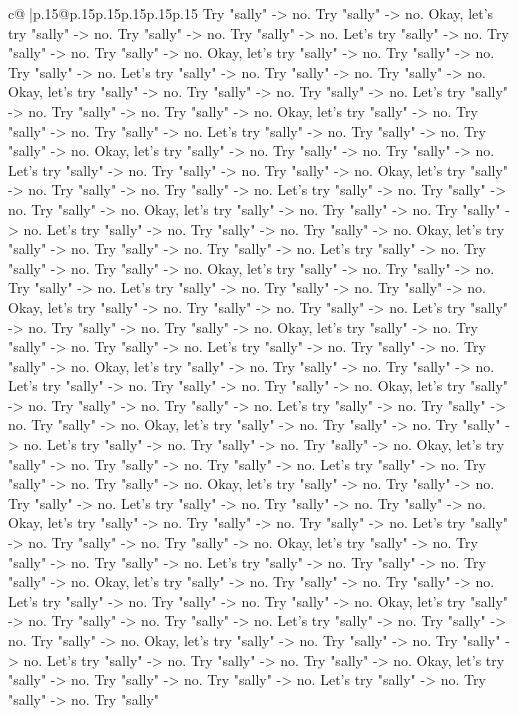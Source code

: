 \documentclass{article}
\begin{document}
{\begin{supertabular}{c@{$\;$}|p{.15\linewidth}@{}p{.15\linewidth}p{.15\linewidth}p{.15\linewidth}p{.15\linewidth}p{.15\linewidth}}
{{{Try "sally" {-}> no. Try "sally" {-}> no. Okay, let's try "sally" {-}> no. Try "sally" {-}> no. Try "sally" {-}> no. Let's try "sally" {-}> no. Try "sally" {-}> no. Try "sally" {-}> no. Okay, let's try "sally" {-}> no. Try "sally" {-}> no. Try "sally" {-}> no. Let's try "sally" {-}> no. Try "sally" {-}> no. Try "sally" {-}> no. Okay, let's try "sally" {-}> no. Try "sally" {-}> no. Try "sally" {-}> no. Let's try "sally" {-}> no. Try "sally" {-}> no. Try "sally" {-}> no. Okay, let's try "sally" {-}> no. Try "sally" {-}> no. Try "sally" {-}> no. Let's try "sally" {-}> no. Try "sally" {-}> no. Try "sally" {-}> no. Okay, let's try "sally" {-}> no. Try "sally" {-}> no. Try "sally" {-}> no. Let's try "sally" {-}> no. Try "sally" {-}> no. Try "sally" {-}> no. Okay, let's try "sally" {-}> no. Try "sally" {-}> no. Try "sally" {-}> no. Let's try "sally" {-}> no. Try "sally" {-}> no. Try "sally" {-}> no. Okay, let's try "sally" {-}> no. Try "sally" {-}> no. Try "sally" {-}> no. Let's try "sally" {-}> no. Try "sally" {-}> no. Try "sally" {-}> no. Okay, let's try "sally" {-}> no. Try "sally" {-}> no. Try "sally" {-}> no. Let's try "sally" {-}> no. Try "sally" {-}> no. Try "sally" {-}> no. Okay, let's try "sally" {-}> no. Try "sally" {-}> no. Try "sally" {-}> no. Let's try "sally" {-}> no. Try "sally" {-}> no. Try "sally" {-}> no. Okay, let's try "sally" {-}> no. Try "sally" {-}> no. Try "sally" {-}> no. Let's try "sally" {-}> no. Try "sally" {-}> no. Try "sally" {-}> no. Okay, let's try "sally" {-}> no. Try "sally" {-}> no. Try "sally" {-}> no. Let's try "sally" {-}> no. Try "sally" {-}> no. Try "sally" {-}> no. Okay, let's try "sally" {-}> no. Try "sally" {-}> no. Try "sally" {-}> no. Let's try "sally" {-}> no. Try "sally" {-}> no. Try "sally" {-}> no. Okay, let's try "sally" {-}> no. Try "sally" {-}> no. Try "sally" {-}> no. Let's try "sally" {-}> no. Try "sally" {-}> no. Try "sally" {-}> no. Okay, let's try "sally" {-}> no. Try "sally" {-}> no. Try "sally" {-}> no. Let's try "sally" {-}> no. Try "sally" {-}> no. Try "sally" {-}> no. Okay, let's try "sally" {-}> no. Try "sally" {-}> no. Try "sally" {-}> no. Let's try "sally" {-}> no. Try "sally" {-}> no. Try "sally" {-}> no. Okay, let's try "sally" {-}> no. Try "sally" {-}> no. Try "sally" {-}> no. Let's try "sally" {-}> no. Try "sally" {-}> no. Try "sally" {-}> no. Okay, let's try "sally" {-}> no. Try "sally" {-}> no. Try "sally" {-}> no. Let's try "sally" {-}> no. Try "sally" {-}> no. Try "sally" {-}> no. Okay, let's try "sally" {-}> no. Try "sally" {-}> no. Try "sally" {-}> no. Let's try "sally" {-}> no. Try "sally" {-}> no. Try "sally" {-}> no. Okay, let's try "sally" {-}> no. Try "sally" {-}> no. Try "sally" {-}> no. Let's try "sally" {-}> no. Try "sally" {-}> no. Try "sally" {-}> no. Okay, let's try "sally" {-}> no. Try "sally" {-}> no. Try "sally" {-}> no. Let's try "sally" {-}> no. Try "sally" {-}> no. Try "sally" {-}> no. Okay, let's try "sally" {-}> no. Try "sally" {-}> no. Try "sally" {-}> no. Let's try "sally" {-}> no. Try "sally" {-}> no. Try "sally" {-}> no. Okay, let's try "sally" {-}> no. Try "sally" {-}> no. Try "sally" {-}> no. Let's try "sally" {-}> no. Try "sally" {-}> no. Try "sally" }}}
\end{supertabular}}
\end{document}
